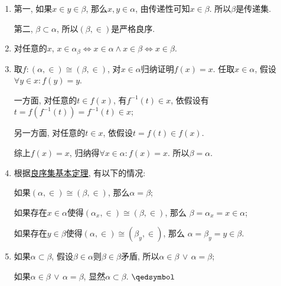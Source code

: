 \documentclass[UTF8]{ctexart}
\begin{document}

\begin{enumerate}
    \item 第一, 如果$x\in y\in\beta$, 那么$x,y\in\alpha$, 由传递性可知$x\in\beta$.
    所以$\beta$是传递集.
    
    \hspace{2.17em}
    第二, $\beta\subset\alpha$, 所以$(\beta,\in)$是严格良序.

    \item 对任意的$x$,
    $x\in\alpha_\beta\iff x\in\alpha\land x\in\beta\iff x\in\beta$.

    \item 取$f:(\alpha,\in)\cong(\beta,\in)$, 对$x\in\alpha$归纳证明$f(x)=x$.
    任取$x\in\alpha$, 假设$\forall y\in x:f(y)=y$.

    \hspace{2.17em}
    一方面, 对任意的$t\in f(x)$, 有$f^{-1}(t)\in x$,
    依假设有$t=f(f^{-1}(t))=f^{-1}(t)\in x$;

    \hspace{2.17em}
    另一方面, 对任意的$t\in x$, 依假设$t=f(t)\in f(x)$.

    \hspace{2.17em}
    综上$f(x)=x$, 归纳得$\forall x\in\alpha:f(x)=x$. 所以$\beta=\alpha$.

    \item 根据\href{../01 序关系/04 良序关系#nameddest=sec:定理2.4}{良序集基本定理},
    有以下的情况:

    \hspace{2.17em}
    如果$(\alpha,\in)\cong(\beta,\in)$, 那么$\alpha=\beta$;

    \hspace{2.17em}
    如果存在$x\in\alpha$使得$(\alpha_x,\in)\cong(\beta,\in)$, 那么
    $\beta=\alpha_x=x\in\alpha$;

    \hspace{2.17em}
    如果存在$y\in\beta$使得$(\alpha,\in)\cong(\beta_y,\in)$, 那么
    $\alpha=\beta_y=y\in\beta$.

    \item 如果$\alpha\subset\beta$, 假设$\beta\in\alpha$则$\beta\in\beta$矛盾,
    所以$\alpha\in\beta\,\lor\,\alpha=\beta$;

    \hspace{2.17em}
    如果$\alpha\in\beta\,\lor\,\alpha=\beta$,
    显然$\alpha\subset\beta$. \hfill $\qedsymbol$
\end{enumerate}
\end{document}
